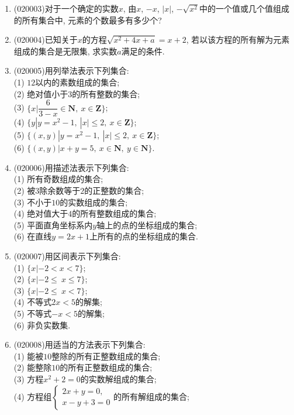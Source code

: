 \documentclass[10pt,a4paper]{article}
\begin{document}
\begin{enumerate}[1.]
\item {\tiny (020003)}对于一个确定的实数$x$, 由$x$, $-x$, $|x|$, $-\sqrt{x^2}$中的一个值或几个值组成的所有集合中, 元素的个数最多有多少个?
\item {\tiny (020004)}已知关于$x$的方程$\sqrt {x^2+4x+a}=x+2$, 若以该方程的所有解为元素组成的集合是无限集, 求实数$a$满足的条件.
\item {\tiny (020005)}用列举法表示下列集合:\\
(1) $12$以内的素数组成的集合;\\
(2) 绝对值小于$3$的所有整数的集合;\\
(3) $\{x|\dfrac 6{3-x}\in\mathbf{N}, \ x\in\mathbf{Z}\}$;\\
(4) $\{y|y=x^2-1 , \ |x| \le 2, \ x\in\mathbf{Z}\}$;\\
(5) $\{( x,y)|y=x^2-1,\ |x|\le 2, \ x\in\mathbf{Z}\}$;\\
(6) $\{( x,y)|x +y=5, \ x\in\mathbf{N}, \ y\in\mathbf{N}\}$.
\item {\tiny (020006)}用描述法表示下列集合:\\
(1) 所有奇数组成的集合;\\
(2) 被$3$除余数等于$2$的正整数的集合;\\
(3) 不小于$10$的实数组成的集合;\\
(4) 绝对值大于$4$的所有整数组成的集合;\\
(5) 平面直角坐标系内$y$轴上的点的坐标组成的集合;\\
(6) 在直线$y=2x+1$上所有的点的坐标组成的集合.
\item {\tiny (020007)}用区间表示下列集合:\\
(1) $\{x|-2<x<7\}$;\\
(2) $\{x|-2\le\ x\le7\}$;\\
(3) $\{x|-2\le\ x<7\}$;\\
(4) 不等式$2x<5$的解集;\\
(5) 不等式$-x<5$的解集; \\
(6) 非负实数集.
\item {\tiny (020008)}用适当的方法表示下列集合:\\
(1) 能被$10$整除的所有正整数组成的集合;\\
(2) 能整除$10$的所有正整数组成的集合;\\
(3) 方程$x^2+2=0$的实数解组成的集合;\\
(4) 方程组$\begin{cases}2x+y=0, \\ x-y+3=0\end{cases}$的所有解组成的集合;\\

\end{enumerate}
\end{document}
